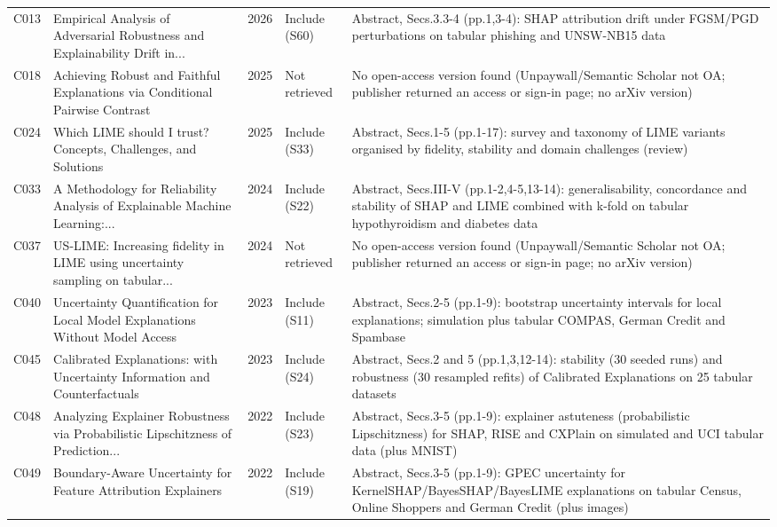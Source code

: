\begin{longtable}{@{}P{1.0cm}P{6.3cm}P{0.7cm}P{1.6cm}P{6.1cm}@{}}
C013 & Empirical Analysis of Adversarial Robustness and Explainability Drift in... & 2026 & Include (S60) & Abstract, Secs.3.3-4 (pp.1,3-4): SHAP attribution drift under FGSM/\allowbreak{}PGD perturbations on tabular phishing and UNSW-NB15 data \\
C018 & Achieving Robust and Faithful Explanations via Conditional Pairwise Contrast & 2025 & Not retrieved & No open-access version found (Unpaywall/\allowbreak{}Semantic Scholar not OA; publisher returned an access or sign-in page; no arXiv version) \\
C024 & Which LIME should I trust? Concepts, Challenges, and Solutions & 2025 & Include (S33) & Abstract, Secs.1-5 (pp.1-17): survey and taxonomy of LIME variants organised by fidelity, stability and domain challenges (review) \\
C033 & A Methodology for Reliability Analysis of Explainable Machine Learning:... & 2024 & Include (S22) & Abstract, Secs.III-V (pp.1-2,4-5,13-14): generalisability, concordance and stability of SHAP and LIME combined with k-fold on tabular hypothyroidism and diabetes data \\
C037 & US-LIME: Increasing fidelity in LIME using uncertainty sampling on tabular... & 2024 & Not retrieved & No open-access version found (Unpaywall/\allowbreak{}Semantic Scholar not OA; publisher returned an access or sign-in page; no arXiv version) \\
C040 & Uncertainty Quantification for Local Model Explanations Without Model Access & 2023 & Include (S11) & Abstract, Secs.2-5 (pp.1-9): bootstrap uncertainty intervals for local explanations; simulation plus tabular COMPAS, German Credit and Spambase \\
C045 & Calibrated Explanations: with Uncertainty Information and Counterfactuals & 2023 & Include (S24) & Abstract, Secs.2 and 5 (pp.1,3,12-14): stability (30 seeded runs) and robustness (30 resampled refits) of Calibrated Explanations on 25 tabular datasets \\
C048 & Analyzing Explainer Robustness via Probabilistic Lipschitzness of Prediction... & 2022 & Include (S23) & Abstract, Secs.3-5 (pp.1-9): explainer astuteness (probabilistic Lipschitzness) for SHAP, RISE and CXPlain on simulated and UCI tabular data (plus MNIST) \\
C049 & Boundary-Aware Uncertainty for Feature Attribution Explainers & 2022 & Include (S19) & Abstract, Secs.3-5 (pp.1-9): GPEC uncertainty for KernelSHAP/\allowbreak{}BayesSHAP/\allowbreak{}BayesLIME explanations on tabular Census, Online Shoppers and German Credit (plus images) \\

\end{longtable}
